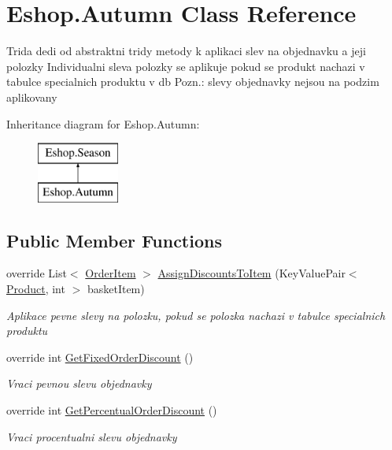 \hypertarget{class_eshop_1_1_autumn}{}\section{Eshop.\+Autumn Class Reference}
\label{class_eshop_1_1_autumn}


Trida dedi od abstraktni tridy metody k aplikaci slev na objednavku a jeji polozky Individualni sleva polozky se aplikuje pokud se produkt nachazi v tabulce specialnich produktu v db Pozn.\+: slevy objednavky nejsou na podzim aplikovany  


Inheritance diagram for Eshop.\+Autumn\+:\begin{figure}[H]
\begin{center}
\leavevmode
\includegraphics[height=2.000000cm]{class_eshop_1_1_autumn}
\end{center}
\end{figure}
\subsection*{Public Member Functions}
\begin{DoxyCompactItemize}
\item 
override List$<$ \mbox{\hyperlink{class_eshop_1_1_order_item}{Order\+Item}} $>$ \mbox{\hyperlink{class_eshop_1_1_autumn_a8b81fea543d4da4da80b981e3d18e71f}{Assign\+Discounts\+To\+Item}} (Key\+Value\+Pair$<$ \mbox{\hyperlink{class_eshop_1_1_product}{Product}}, int $>$ basket\+Item)
\begin{DoxyCompactList}\small\item\em Aplikace pevne slevy na polozku, pokud se polozka nachazi v tabulce specialnich produktu \end{DoxyCompactList}\item 
override int \mbox{\hyperlink{class_eshop_1_1_autumn_ac5ee4a4898239df20f6d62a88adf039a}{Get\+Fixed\+Order\+Discount}} ()
\begin{DoxyCompactList}\small\item\em Vraci pevnou slevu objednavky \end{DoxyCompactList}\item 
override int \mbox{\hyperlink{class_eshop_1_1_autumn_afa26bcecad81dc25d57e5fed3379810c}{Get\+Percentual\+Order\+Discount}} ()
\begin{DoxyCompactList}\small\item\em Vraci procentualni slevu objednavky \end{DoxyCompactList}\end{DoxyCompactItemize}
